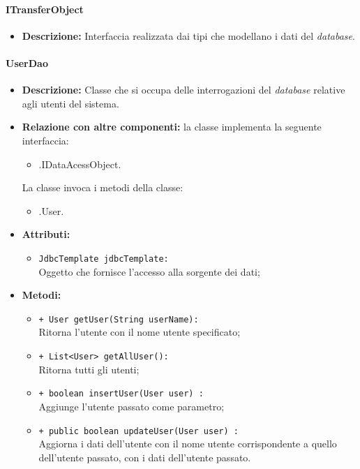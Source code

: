 \paragraph{ITransferObject}
\label{itransferobject}
\begin{flushleft}
\begin{itemize}
\item \textbf{Descrizione:} Interfaccia realizzata dai tipi che modellano i dati del \textit{database}.
\end{itemize}
\end{flushleft}

\paragraph{UserDao}
\label{userdao}
\begin{flushleft}
\begin{itemize}
\item \textbf{Descrizione:} Classe che si occupa delle interrogazioni del \textit{database} relative agli utenti del sistema.
\item \textbf{Relazione con altre componenti:} la classe implementa la seguente interfaccia:
		\begin{itemize}
			\item \smodel{}.IDataAcessObject.
		\end{itemize}
		La classe invoca i metodi della classe:
		\begin{itemize}
			\item \smodel{}.User.
		\end{itemize}
\item \textbf{Attributi:}
\begin{sloppypar}
\begin{itemize}
\item \texttt{JdbcTemplate jdbcTemplate:}\\ Oggetto che fornisce l'accesso alla sorgente dei dati;
\end{itemize}
\end{sloppypar}
\item \textbf{Metodi:}
\begin{sloppypar}
\begin{itemize}
\item \texttt{+ User getUser(String userName):}\\ Ritorna l’utente con il nome utente specificato; 
\item \texttt{+ List<User> getAllUser():}\\ Ritorna tutti gli utenti;
\item \texttt{+ boolean insertUser(User user) :}\\ Aggiunge l'utente passato come parametro;
\item \texttt{+ public boolean updateUser(User user) :}\\ Aggiorna i dati dell'utente con il nome utente corrispondente a quello dell'utente passato, con i dati dell'utente passato.
\end{itemize}
\end{sloppypar}
\end{itemize}
\end{flushleft}

